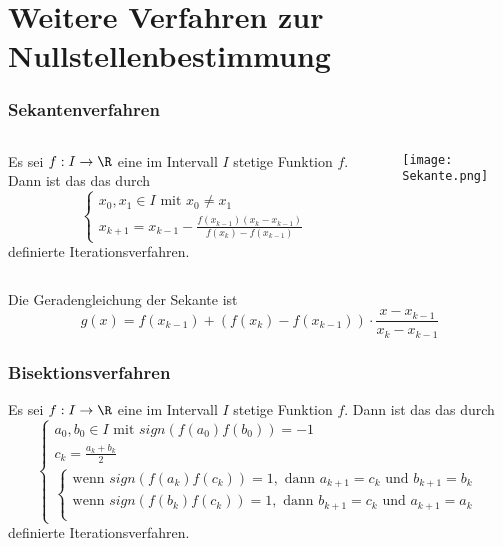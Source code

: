\section{Weitere Verfahren zur Nullstellenbestimmung}
\makeSectionDividerPage
%
\begin{frame}\frametitle{Sekantenverfahren}
\begin{columns}[T]
\begin{column}{0.5 \textwidth}
Es sei $f: I \to \R$ eine im Intervall $I$ stetige Funktion $f$. Dann ist das  das durch \vspace{2mm}
$$
\begin{cases}
x_0, x_1 \in I \text{ mit } x_0\ne x_1\\
x_{k+1}=x_{k-1}-\frac{f(x_{k-1})(x_k-x_{k-1})}{f(x_k)-f(x_{k-1})}
\end{cases}
$$
 \vspace{2mm}
definierte Iterationsverfahren.
\end{column}
\begin{column}{0.5 \textwidth}
\texttt{[image: Sekante.png]}
\end{column}
\end{columns}
\pause \vspace{10mm}
Die Geradengleichung der Sekante ist 
$$
g(x)=f(x_{k-1})+(f(x_k)-f(x_{k-1}))\cdot \frac{x-x_{k-1}}{x_k-x_{k-1}}
$$
\end{frame}
%
\begin{frame}\frametitle{Bisektionsverfahren}
Es sei $f: I \to \R$ eine im Intervall $I$ stetige Funktion $f$. Dann ist das  das durch \vspace{2mm}
$$
\begin{cases}
a_0, b_0 \in I \text{ mit } sign(f(a_0)f(b_0))=-1\\
c_k=\frac{a_k+b_k}{2}\\
\begin{cases}
\text{wenn } sign(f(a_k)f(c_k))=1, \text{ dann } a_{k+1}=c_k \text{ und } b_{k+1}=b_k\\
\text{wenn } sign(f(b_k)f(c_k))=1, \text{ dann } b_{k+1}=c_k \text{ und } a_{k+1}=a_k\\
\end{cases}
\end{cases}
$$
 \vspace{2mm}
definierte Iterationsverfahren.
\end{frame}


